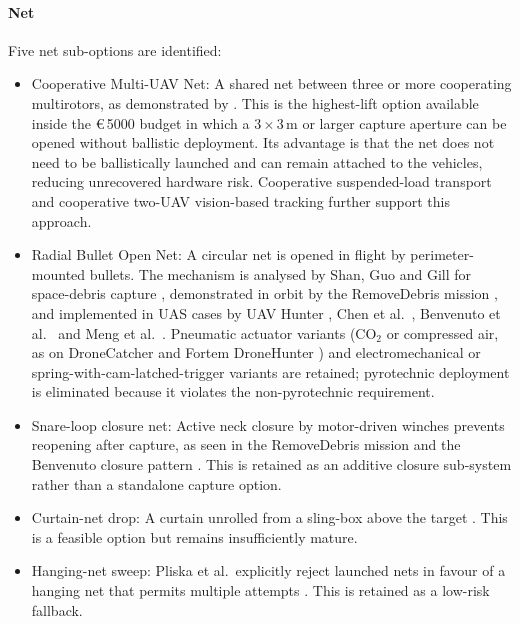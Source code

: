 \paragraph{Net}
Five net sub-options are identified:
\vspace{-8pt}
\begin{itemize}[leftmargin=*]

    \item Cooperative Multi-UAV Net: A shared net between three or more cooperating multirotors, as demonstrated by \cite{Ritz2012CooperativeCatching}. This is the highest-lift option available inside the \euro\,5000 budget in which a $3\times3\,\mathrm{m}$ or larger capture aperture can be opened without ballistic deployment. Its advantage is that the net does not need to be ballistically launched and can remain attached to the vehicles, reducing unrecovered hardware risk. Cooperative suspended-load transport \cite{Sun2025MLoad} and cooperative two-UAV vision-based tracking \cite{Opromolla2019AirborneLearning} further support this approach.

    \item Radial Bullet Open Net: A circular net is opened in flight by perimeter-mounted bullets. The mechanism is analysed by Shan, Guo and Gill for space-debris capture \cite{Shan2017DeploymentRemoval}, demonstrated in orbit by the RemoveDebris mission \cite{Forshaw2020TheLaunch, Aglietti2020TheOperations}, and implemented in UAS cases by UAV Hunter \cite{Zhang2024UAVDefense}, Chen et al.\ \cite{Chen2022AnTechnology}, Benvenuto et al.\ \cite{Benvenuto2015DynamicsRemoval} and Meng et al.\ \cite{XinMeng20182018China}. Pneumatic actuator variants (CO$_2$ or compressed air, as on DroneCatcher \cite{DroneCatcher} and Fortem DroneHunter \cite{Fortem}) and electromechanical or spring-with-cam-latched-trigger variants \cite{Chen2022AnTechnology, XinMeng20182018China} are retained; pyrotechnic deployment is eliminated because it violates the non-pyrotechnic requirement.

    \item Snare-loop closure net: Active neck closure by motor-driven winches prevents reopening after capture, as seen in the RemoveDebris mission \cite{Forshaw2020TheLaunch, Aglietti2020TheOperations} and the Benvenuto closure pattern \cite{Benvenuto2015DynamicsRemoval}. This is retained as an additive closure sub-system rather than a standalone capture option.

    \item Curtain-net drop: A curtain unrolled from a sling-box above the target \cite{Killianetal}. This is a feasible option but remains insufficiently mature.

    \item Hanging-net sweep: Pliska et al.\ explicitly reject launched nets in favour of a hanging net that permits multiple attempts \cite{Pliska2024TowardsCapture}. This is retained as a low-risk fallback.

\end{itemize}
\vspace{-15pt}

